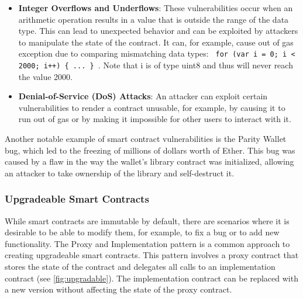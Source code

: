 \begin{itemize}
	\tightlist
	\item
	\textbf{Integer Overflows and Underflows}: These vulnerabilities occur
	when an arithmetic operation results in a value that is outside the
	range of the data type. This can lead to unexpected behavior and can
	be exploited by attackers to manipulate the state of the contract.
	It can, for example, cause out of gas exception due to comparing mismatching data types:  \verb| for (var i = 0; i < 2000; i++) { ... } |. Note that i is of type uint8 and thus will never reach the value 2000.
	
	
	\item
	\textbf{Denial-of-Service (DoS) Attacks}: An attacker can exploit
	certain vulnerabilities to render a contract unusable, for example, by
	causing it to run out of gas or by making it impossible for other
	users to interact with it.
\end{itemize}

Another notable example of smart contract vulnerabilities is the Parity
Wallet bug, which led to the freezing of millions of dollars worth of
Ether. This bug was caused by a flaw in the way the wallet's library
contract was initialized, allowing an attacker to take ownership of the
library and self-destruct it.

\subsubsection{Upgradeable Smart
	Contracts}\label{upgradeable-smart-contracts}

While smart contracts are immutable by default, there are scenarios
where it is desirable to be able to modify them, for example, to fix a
bug or to add new functionality. The Proxy and Implementation pattern is
a common approach to creating upgradeable smart contracts. This pattern
involves a proxy contract that stores the state of the contract and
delegates all calls to an implementation contract (see \autoref{fig:upgradable}). The implementation
contract can be replaced with a new version without affecting the state
of the proxy contract.

